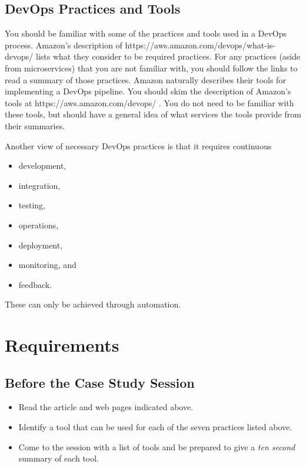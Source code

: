 \documentclass{csse4400}
\begin{document}
\subsection{DevOps Practices and Tools}\label{sec:DevOps-Practices}
You should be familiar with some of the practices and tools used in a DevOps process.
Amazon's description of 
{https://aws.amazon.com/devops/what-is-devops/} \cite{AWS-DevOps} lists what they consider to be required practices.
For any practices (aside from microservices) that you are not familiar with, you should follow the links to read a summary of those practices.
Amazon naturally describes their tools for implementing a DevOps pipeline.
You should skim the description of Amazon's tools at 
{https://aws.amazon.com/devops/} \cite{AWS-DevOps-Tools}.
You do not need to be familiar with these tools, but should have a general idea of what services the tools provide from their summaries.

\newpage
\noindent
Another view of necessary DevOps practices is that it requires continuous
\begin{itemize}[nosep]
    \item development,
    \item integration,
    \item testing,
    \item operations,
    \item deployment,
    \item monitoring, and
    \item feedback.
\end{itemize}
These can only be achieved through automation.



\section{Requirements}

\subsection*{Before the Case Study Session}
\begin{itemize}
    \item Read the article and web pages indicated above.
    \item Identify a tool that can be used for each of the seven practices listed above.
    \item Come to the session with a list of tools and be prepared to give a \textit{ten second} summary of each tool.
\end{itemize}
\end{document}
